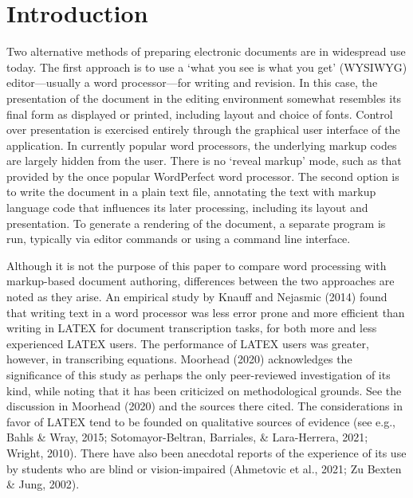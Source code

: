 \documentclass[11pt]{sig-alternate}
\begin{document}
\section*{Introduction}
\begin{large}
Two alternative methods of preparing electronic documents are in widespread use today. The first approach is to use a ‘what you see is what you get’ (WYSIWYG) editor—usually a word processor—for writing and revision. In this case, the presentation of the document in the editing environment somewhat resembles its final form as displayed or printed, including layout and choice of fonts. Control over presentation is exercised entirely through the graphical user interface of the application. In currently popular word processors, the underlying markup codes are largely hidden from the user. There is no ‘reveal markup’ mode, such as that provided by the once popular WordPerfect word processor. The second option is to write the document in a plain text file, annotating the text with markup language code that influences its later processing, including its layout and presentation. To generate a rendering of the document, a separate program is run, typically via editor commands or using a command line interface.

Although it is not the purpose of this paper to compare word processing with markup-based document authoring, differences between the two approaches are noted as they arise. An empirical study by Knauff and Nejasmic (2014) found that writing text in a word processor was less error prone and more efficient than writing in LATEX for document transcription tasks, for both more and less experienced LATEX users. The performance of LATEX users was greater, however, in transcribing equations. Moorhead (2020) acknowledges the significance of this study as perhaps the only peer-reviewed investigation of its kind, while noting that it has been criticized on methodological grounds. See the discussion in Moorhead (2020) and the sources there cited. The considerations in favor of LATEX tend to be founded on qualitative sources of evidence (see e.g., Bahls \& Wray, 2015; Sotomayor-Beltran, Barriales, \& Lara-Herrera, 2021; Wright, 2010). There have also been anecdotal reports of the experience of its use by students who are blind or vision-impaired (Ahmetovic et al., 2021; Zu Bexten \& Jung, 2002).
	

\end{large}
\end{document}
